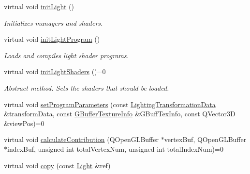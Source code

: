 \begin{DoxyCompactItemize}
\item 
\mbox{\label{class_geometry_engine_1_1_geometry_world_item_1_1_geometry_light_1_1_light_ab3be1e49344f033c893120a3de792b46}} 
virtual void \mbox{\hyperlink{class_geometry_engine_1_1_geometry_world_item_1_1_geometry_light_1_1_light_ab3be1e49344f033c893120a3de792b46}{init\+Light}} ()
\begin{DoxyCompactList}\small\item\em Initializes managers and shaders. \end{DoxyCompactList}\item 
\mbox{\label{class_geometry_engine_1_1_geometry_world_item_1_1_geometry_light_1_1_light_a199c45f95482b66a0b5b45c5fdecb2e7}} 
virtual void \mbox{\hyperlink{class_geometry_engine_1_1_geometry_world_item_1_1_geometry_light_1_1_light_a199c45f95482b66a0b5b45c5fdecb2e7}{init\+Light\+Program}} ()
\begin{DoxyCompactList}\small\item\em Loads and compiles light shader programs. \end{DoxyCompactList}\item 
\mbox{\label{class_geometry_engine_1_1_geometry_world_item_1_1_geometry_light_1_1_light_a7bcd2133b4b691496691148e73c5411b}} 
virtual void \mbox{\hyperlink{class_geometry_engine_1_1_geometry_world_item_1_1_geometry_light_1_1_light_a7bcd2133b4b691496691148e73c5411b}{init\+Light\+Shaders}} ()=0
\begin{DoxyCompactList}\small\item\em Abstract method. Sets the shaders that should be loaded. \end{DoxyCompactList}\item 
virtual void \mbox{\hyperlink{class_geometry_engine_1_1_geometry_world_item_1_1_geometry_light_1_1_light_a366be5945389fe58df4bf5aa8c43138f}{set\+Program\+Parameters}} (const \mbox{\hyperlink{class_geometry_engine_1_1_lighting_transformation_data}{Lighting\+Transformation\+Data}} \&transform\+Data, const \mbox{\hyperlink{class_geometry_engine_1_1_g_buffer_texture_info}{G\+Buffer\+Texture\+Info}} \&G\+Buff\+Tex\+Info, const Q\+Vector3D \&view\+Pos)=0
\item 
virtual void \mbox{\hyperlink{class_geometry_engine_1_1_geometry_world_item_1_1_geometry_light_1_1_light_a58aa2a3520f7aa2b03afcb4123e7530a}{calculate\+Contribution}} (Q\+Open\+G\+L\+Buffer $\ast$vertex\+Buf, Q\+Open\+G\+L\+Buffer $\ast$index\+Buf, unsigned int total\+Vertex\+Num, unsigned int total\+Index\+Num)=0
\item 
virtual void \mbox{\hyperlink{class_geometry_engine_1_1_geometry_world_item_1_1_geometry_light_1_1_light_ae3f695bb7e3d4fd3a02bdffaddd07c1a}{copy}} (const \mbox{\hyperlink{class_geometry_engine_1_1_geometry_world_item_1_1_geometry_light_1_1_light}{Light}} \&ref)
\end{DoxyCompactItemize}
